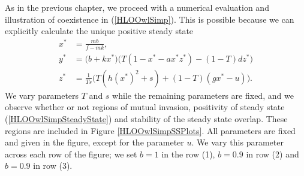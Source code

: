 \documentclass[12pt]{UOthesis}
\theoremstyle{remarkstyle}
\begin{document}
As in the previous chapter, we proceed with a numerical evaluation and illustration of coexistence in (\ref{HLOOwlSimp}). This is possible because we can explicitly calculate the unique positive steady state
\begin{equation}
	\begin{split}
		x^*&=\frac{mb}{f-mk},\\
		y^*&=\Big(b+kx^*\Big)\Big(T(1-x^*-ax^*z^*)-(1-T)dz^*\Big)\\
		z^*&=\frac{1}{Ts}\Big(T(h(x^*)^2+s)+(1-T)(gx^*-u)\Big).
	\end{split}
	\label{HLOOwlSimpSteadyState}
\end{equation}
We vary parameters $T$ and $s$ while the remaining parameters are fixed, and we observe whether or not regions of mutual invasion, positivity of steady state (\ref{HLOOwlSimpSteadyState}) and stability of the steady state overlap. These regions are included in Figure \ref{HLOOwlSimpSSPlots}. All parameters are fixed and given in the figure, except for the parameter $u$. We vary this parameter across each row of the figure; we set $b=1$ in the row (1), $b=0.9$ in row (2) and $b=0.9$ in row (3).\\
\end{document}
